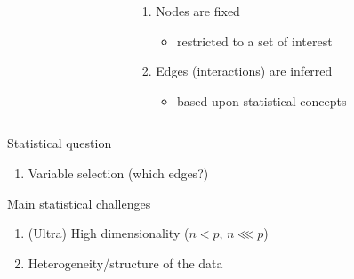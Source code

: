 \begin{frame}
\begin{columns}[c]
\begin{column}{.55\textwidth}
    \end{column}
    \begin{column}{.45\textwidth}
      \begin{footnotesize}
        \begin{enumerate}
        \item Nodes are fixed
            \noindent\begin{itemize}
            \item \scriptsize \alert{restricted}   to  a   set  of   interest
            \end{itemize}
        \item Edges (interactions) are inferred
          \begin{scriptsize}
            \begin{itemize}
            \item \scriptsize based upon \alert{statistical} concepts
            \end{itemize}
          \end{scriptsize}
        \end{enumerate}
      \end{footnotesize}
    \end{column}
  \end{columns}

  \begin{block}{Statistical question}
    \vspace{-.25cm}
    \begin{enumerate}
    \item Variable selection (which edges?)
    \end{enumerate}
  \end{block}

  \begin{block}{Main statistical challenges}
    \vspace{-.25cm}
    \begin{enumerate}
    \item (Ultra) High dimensionality ($n<p$, $n\lll p$)
    \item Heterogeneity/structure of the data
    \end{enumerate}
  \end{block}

\end{frame}

